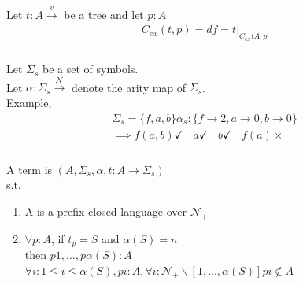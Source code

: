 \subsubsection{}
Let $t:A\xrightarrow{v}$ be a tree and let $p:A$
\begin{gather}
    C_{ex}(t,p) = df = t \vert_{C_{ex}(A,p}
\end{gather}

\subsubsection{}
Let $\Sigma_{s}$ be a set of symbols.\\
Let $\alpha: \Sigma_{s} \xrightarrow{ \mathcal{N}}$ denote the arity map of $\Sigma_{s}$.\\

Example,\\
\begin{gather}
    \Sigma_{s} = \{f,a,b\}
    \alpha_{s}: \{f\xrightarrow{}2, a\xrightarrow{}0, b\xrightarrow{}0\}\\
    \implies f(a,b) \checkmark \ \ \ \ a \checkmark \ \ \ \ b \checkmark \ \ \ \ f(a) \times
\end{gather}

\subsubsection{}
A term is $(A,\Sigma_{s}, \alpha, t: A\xrightarrow{} \Sigma_{s})$\\
s.t.
\begin{enumerate}
    \item A is a prefix-closed language over $\mathcal{N}_{+}$
    \item $\forall p: A$, if $t_{p}=S$ and $\alpha(S)=n$\\
    then $p1,..., p\alpha(S): A$ \ \ \ \ \  \ \ \ 
    $\forall i: 1 \leq i \leq \alpha(S), pi: A, \forall i: \mathcal{N}_{+}\backslash[1,...,\alpha(S)]pi\notin A$
\end{enumerate}
\newpage
